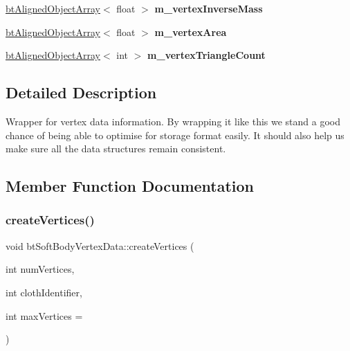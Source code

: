 \begin{DoxyCompactItemize}
\hyperlink{classbtAlignedObjectArray}{bt\+Aligned\+Object\+Array}$<$ float $>$ {\bfseries m\+\_\+vertex\+Inverse\+Mass}
\item 
\mbox{\label{classbtSoftBodyVertexData_a19c65f58d5cba5cc986c482ca8c32027}} 
\hyperlink{classbtAlignedObjectArray}{bt\+Aligned\+Object\+Array}$<$ float $>$ {\bfseries m\+\_\+vertex\+Area}
\item 
\mbox{\label{classbtSoftBodyVertexData_a7c41f443c90d6611f0bcc27a86ebc847}} 
\hyperlink{classbtAlignedObjectArray}{bt\+Aligned\+Object\+Array}$<$ int $>$ {\bfseries m\+\_\+vertex\+Triangle\+Count}
\end{DoxyCompactItemize}


\subsection{Detailed Description}
Wrapper for vertex data information. By wrapping it like this we stand a good chance of being able to optimise for storage format easily. It should also help us make sure all the data structures remain consistent. 

\subsection{Member Function Documentation}
\mbox{\label{classbtSoftBodyVertexData_ac3ec63020379a29c984904deb4fc92b2}} 
\subsubsection{\texorpdfstring{create\+Vertices()}{createVertices()}\hspace{0.1cm}{\footnotesize\ttfamily [1/2]}}
{\footnotesize\ttfamily void bt\+Soft\+Body\+Vertex\+Data\+::create\+Vertices (\begin{DoxyParamCaption}\item[{int}]{num\+Vertices,  }\item[{int}]{cloth\+Identifier,  }\item[{int}]{max\+Vertices = {} }\end{DoxyParamCaption})\hspace{0.3cm}{\ttfamily [inline]}}

